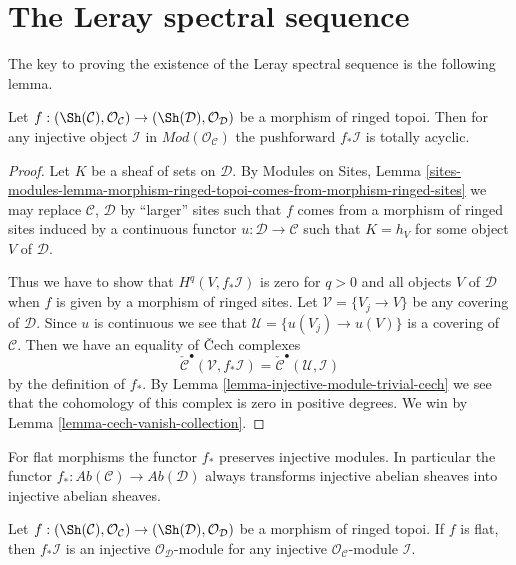 \section{The Leray spectral sequence}
\label{section-leray}

\noindent
The key to proving the existence of the Leray spectral sequence is
the following lemma.

\begin{lemma}
\label{lemma-direct-image-injective-sheaf}
Let $f : (\Sh(\mathcal{C}), \mathcal{O}_\mathcal{C}) \to
(\Sh(\mathcal{D}), \mathcal{O}_\mathcal{D})$ be a morphism of ringed topoi.
Then for any injective object $\mathcal{I}$ in
$\textit{Mod}(\mathcal{O}_\mathcal{C})$
the pushforward $f_*\mathcal{I}$ is totally acyclic.
\end{lemma}

\begin{proof}
Let $K$ be a sheaf of sets on $\mathcal{D}$.
By
Modules on Sites, Lemma
\ref{sites-modules-lemma-morphism-ringed-topoi-comes-from-morphism-ringed-sites}
we may replace $\mathcal{C}$, $\mathcal{D}$ by ``larger'' sites such
that $f$ comes from a morphism of ringed sites induced by a continuous
functor $u : \mathcal{D} \to \mathcal{C}$ such that
$K = h_V$ for some object $V$ of $\mathcal{D}$.

\medskip\noindent
Thus we have to show that $H^q(V, f_*\mathcal{I})$ is zero
for $q > 0$ and all objects $V$ of $\mathcal{D}$ when $f$ is given
by a morphism of ringed sites. Let $\mathcal{V} = \{V_j \to V\}$
be any covering of $\mathcal{D}$. Since $u$ is continuous we see that
$\mathcal{U} = \{u(V_j) \to u(V)\}$ is a covering of $\mathcal{C}$.
Then we have an equality of {\v C}ech complexes
$$
\check{\mathcal{C}}^\bullet(\mathcal{V}, f_*\mathcal{I})
=
\check{\mathcal{C}}^\bullet(\mathcal{U}, \mathcal{I})
$$
by the definition of $f_*$. By
Lemma \ref{lemma-injective-module-trivial-cech}
we see that the cohomology of this complex is zero in positive degrees.
We win by
Lemma \ref{lemma-cech-vanish-collection}.
\end{proof}

\noindent
For flat morphisms the functor $f_*$ preserves injective modules.
In particular the functor
$f_* : \textit{Ab}(\mathcal{C}) \to \textit{Ab}(\mathcal{D})$ always
 transforms injective
abelian sheaves into injective abelian sheaves.

\begin{lemma}
\label{lemma-pushforward-injective-flat}
Let $f : (\Sh(\mathcal{C}), \mathcal{O}_\mathcal{C}) \to
(\Sh(\mathcal{D}), \mathcal{O}_\mathcal{D})$ be a morphism of ringed topoi.
If $f$ is flat, then $f_*\mathcal{I}$ is an injective
$\mathcal{O}_\mathcal{D}$-module
for any injective $\mathcal{O}_\mathcal{C}$-module $\mathcal{I}$.
\end{lemma}

